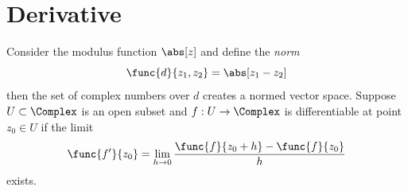 \chapter{Derivative}
Consider the modulus function \(\abs[z]\) and define the \textit{norm}
\begin{equation*}
    \func{d}{z_1,z_2} = \abs[z_1 - z_2]
\end{equation*}
then the set of complex numbers over \(d\) creates a normed vector space. Suppose \(U \subset \Complex\) is an open subset and \(f : U \to \Complex\) is differentiable at point \(z_0 \in U\) if the limit 
\begin{equation*}
    \func{f'}{z_0} =\lim_{h \to 0} \dfrac{\func{f}{z_0 + h} - \func{f}{z_0}}{h}
\end{equation*}
exists.